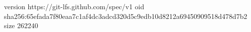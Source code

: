 version https://git-lfs.github.com/spec/v1
oid sha256:65efada7f80eaa7c1af4dc3adcd320d5c9edb10d8212a69450909518d478d7b2
size 262240
